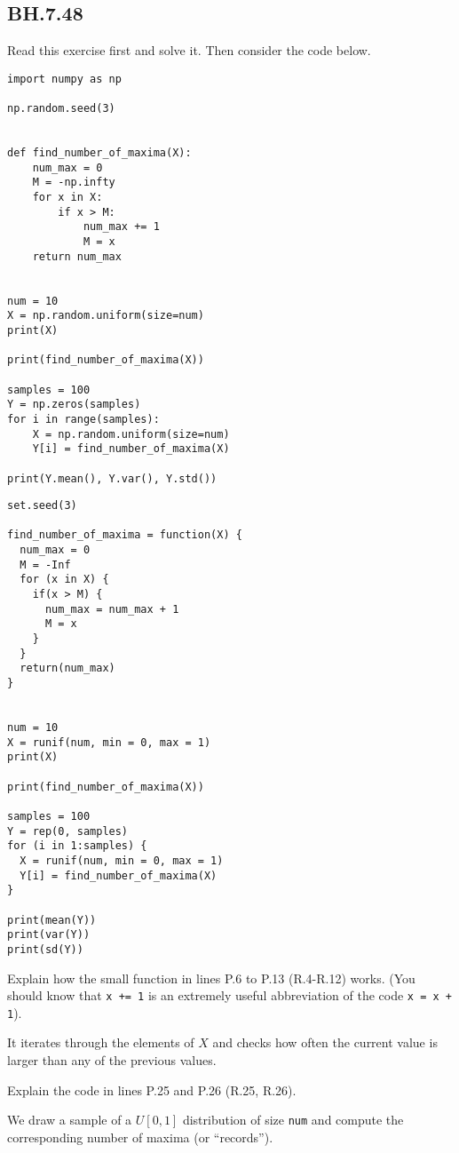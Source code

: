 \subsection{BH.7.48} Read this exercise first and solve it. Then consider the code below.

\begin{verbatim}
import numpy as np

np.random.seed(3)


def find_number_of_maxima(X):
    num_max = 0
    M = -np.infty
    for x in X:
        if x > M:
            num_max += 1
            M = x
    return num_max


num = 10
X = np.random.uniform(size=num)
print(X)

print(find_number_of_maxima(X))

samples = 100
Y = np.zeros(samples)
for i in range(samples):
    X = np.random.uniform(size=num)
    Y[i] = find_number_of_maxima(X)

print(Y.mean(), Y.var(), Y.std())
\end{verbatim}


\begin{verbatim}
set.seed(3)

find_number_of_maxima = function(X) {
  num_max = 0
  M = -Inf
  for (x in X) {
    if(x > M) {
      num_max = num_max + 1
      M = x
    }
  }
  return(num_max)
}


num = 10
X = runif(num, min = 0, max = 1)
print(X)

print(find_number_of_maxima(X))

samples = 100
Y = rep(0, samples)
for (i in 1:samples) {
  X = runif(num, min = 0, max = 1)
  Y[i] = find_number_of_maxima(X)
}

print(mean(Y))
print(var(Y))
print(sd(Y))
\end{verbatim}

\begin{exercise}
Explain how the small function in lines P.6 to P.13 (R.4-R.12) works.
(You should know that \texttt{x += 1} is an extremely useful abbreviation of the code \texttt{x = x + 1}).
\begin{solution}
It iterates through the elements of $X$ and checks how often the current value is larger than any of the previous values.
\end{solution}
\end{exercise}

\begin{exercise}
Explain the code in lines P.25 and P.26 (R.25, R.26).
\begin{solution}
We draw a sample of a $U[0,1]$ distribution of size \verb|num| and compute the corresponding number of maxima (or ``records'').
\end{solution}
\end{exercise}
